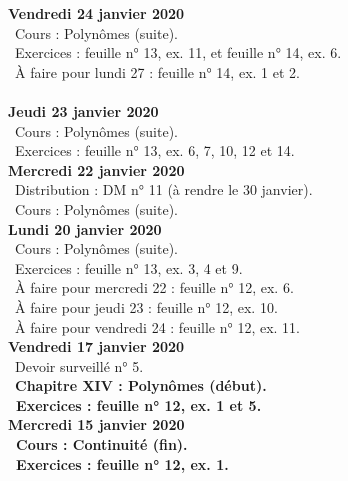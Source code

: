 \documentclass[12pt,a4paper]{article}
\begin{document}
\noindent\textbf{Vendredi 24 janvier 2020}\\
\bu\ Cours : Polynômes (suite).\\
\bu\ Exercices : feuille n° 13, ex. 11, et feuille n° 14, ex. 6.\\
\bu\ À faire pour lundi 27 : feuille n° 14, ex. 1 et 2.\vspace{.4cm}\\

\vspace{.4cm}\\

\noindent\textbf{Jeudi 23 janvier 2020}\\
\bu\ Cours : Polynômes (suite).\\
\bu\ Exercices : feuille n° 13, ex. 6, 7, 10, 12 et 14.\vspace{.4cm}\\

\noindent\textbf{Mercredi 22 janvier 2020} \\
\bu\ Distribution : DM n° 11 (à rendre le 30 janvier).\\
\bu\ Cours : Polynômes (suite).\vspace{.4cm}\\
  
\noindent\textbf{Lundi 20 janvier 2020} \\
\bu\ Cours : Polynômes (suite).\\
\bu\ Exercices : feuille n° 13, ex. 3, 4 et 9.\\
\bu\ À faire pour mercredi 22 : feuille n° 12, ex. 6.\\
\bu\ À faire pour jeudi 23 : feuille n° 12, ex. 10.\\
\bu\ À faire pour vendredi 24 : feuille n° 12, ex. 11.\vspace{.4cm}\\ 
 
\noindent\textbf{Vendredi 17 janvier 2020}\\
\bu\ Devoir surveillé n° 5.\\
\bu\ \bf Chapitre XIV \rm : Polynômes (début).\\
\bu\ Exercices : feuille n° 12, ex. 1 et 5.\vspace{.4cm}\\

\noindent\textbf{Mercredi 15 janvier 2020}\\
\bu\ Cours : Continuité (fin).\\
\bu\ Exercices : feuille n° 12, ex. 1.\vspace{.4cm}\\
\end{document}
